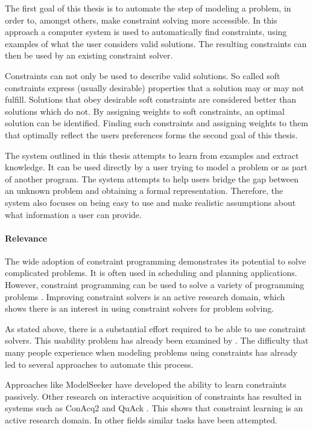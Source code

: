 The first goal of this thesis is to automate the step of modeling a problem, in order to, amongst others, make constraint solving more accessible. In this approach a computer system is used to automatically find constraints, using examples of what the user considers valid solutions. The resulting constraints can then be used by an existing constraint solver.

Constraints can not only be used to describe valid solutions. So called soft constraints express (usually desirable) properties that a solution may or may not fulfill. Solutions that obey desirable soft constraints are considered better than solutions which do not. By assigning weights to soft constraints, an optimal solution can be identified. Finding such constraints and assigning weights to them that optimally reflect the users preferences forms the second goal of this thesis. 

The system outlined in this thesis attempts to learn from examples and extract knowledge. It can be used directly by a user trying to model a problem or as part of another program. The system attempts to help users bridge the gap between an unknown problem and obtaining a formal representation. Therefore, the system also focuses on being easy to use and make realistic assumptions about what information a user can provide.

\paragraph{Relevance}
The wide adoption of constraint programming demonstrates its potential to solve complicated problems. It is often used in scheduling and planning applications. However, constraint programming can be used to solve a variety of programming problems \cite{Dymchenki:GoogleCodeJamEclipse}. Improving constraint solvers is an active research domain, which shows there is an interest in using constraint solvers for problem solving.

As stated above, there is a substantial effort required to be able to use constraint solvers. This usability problem has already been examined by \cite{Wallace:PrinciplesCP}. The difficulty that many people experience when modeling problems using constraints has already led to several approaches to automate this process.

Approaches like  ModelSeeker \cite{Beldiceanu:ModelSeeker} have developed the ability to learn constraints passively.
Other research on interactive acquisition of constraints has resulted in systems such as ConAcq2 \cite{bessiere2007query} and QuAck \cite{bessiere2007query}.
This shows that constraint learning is an active research domain.
In other fields similar tasks have been attempted.

